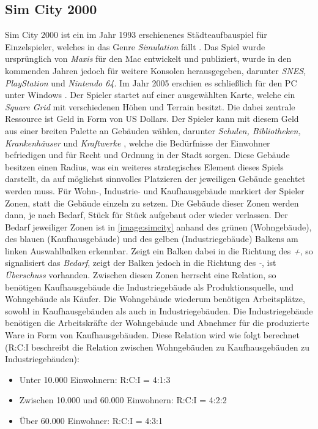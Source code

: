 \subsection{Sim City 2000}
Sim City 2000 ist ein im Jahr 1993 erschienenes Städteaufbauspiel für Einzelspieler, welches in das Genre \textit{Simulation} fällt \cite{simcity:ea}. Das Spiel wurde ursprünglich von \textit{Maxis} für den Mac entwickelt und publiziert, wurde in den kommenden Jahren jedoch für weitere Konsolen herausgegeben, darunter \textit{SNES, PlayStation} und \textit{Nintendo 64}. Im Jahr 2005 erschien es schließlich für den PC unter Windows \cite{simcity:igdb}. Der Spieler startet auf einer ausgewählten Karte, welche ein \textit{Square Grid} mit verschiedenen Höhen und Terrain besitzt. Die dabei zentrale Ressource ist Geld in Form von US Dollars. Der Spieler kann mit diesem Geld aus einer breiten Palette an Gebäuden wählen, darunter \textit{Schulen, Bibliotheken, Krankenhäuser} und \textit{Kraftwerke} \cite*[]{simcity:igdb}, welche die Bedürfnisse der Einwohner befriedigen und für Recht und Ordnung in der Stadt sorgen. Diese Gebäude besitzen einen Radius, was ein weiteres strategisches Element dieses Spiels darstellt, da auf möglichst sinnvolles Platzieren der jeweiligen Gebäude geachtet werden muss. Für Wohn-, Industrie- und Kaufhausgebäude markiert der Spieler Zonen, statt die Gebäude einzeln zu setzen. Die Gebäude dieser Zonen werden dann, je nach Bedarf, Stück für Stück aufgebaut oder wieder verlassen. Der Bedarf jeweiliger Zonen ist in \autoref{image:simcity} anhand des grünen (Wohngebäude), des blauen (Kaufhausgebäude) und des gelben (Industriegebäude) Balkens am linken Auswahlbalken erkennbar. Zeigt ein Balken dabei in die Richtung des \textit{+}, so signalisiert das \textit{Bedarf}, zeigt der Balken jedoch in die Richtung des \textit{-}, ist \textit{Überschuss} vorhanden. Zwischen diesen Zonen herrscht eine Relation, so benötigen Kaufhausgebäude die Industriegebäude als Produktionsquelle, und Wohngebäude als Käufer. Die Wohngebäude wiederum benötigen Arbeitsplätze, sowohl in Kaufhausgebäuden als auch in Industriegebäuden. Die Industriegebäude benötigen die Arbeitskräfte der Wohngebäude und Abnehmer für die produzierte Ware in Form von Kaufhausgebäuden. Diese Relation wird wie folgt berechnet (R:C:I beschreibt die Relation zwischen Wohngebäuden zu Kaufhausgebäuden zu Industriegebäuden): 
\begin{itemize}
    \item Unter 10.000 Einwohnern: R:C:I = 4:1:3
    \item Zwischen 10.000 und 60.000 Einwohnern: R:C:I = 4:2:2
    \item Über 60.000 Einwohner: R:C:I = 4:3:1 \cite*[]{simcity:somacon}
\end{itemize}
